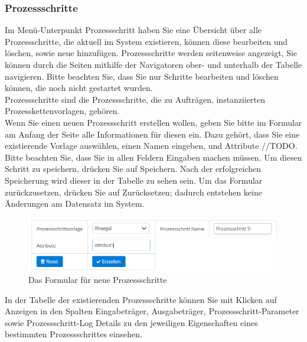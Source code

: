 \documentclass[enabledeprecatedfontcommands,fontsize=12pt,paper=a4,twoside]{scrartcl}
\begin{document}
\subsubsection{Prozessschritte}

Im Menü-Unterpunkt Prozessschritt haben Sie eine Übersicht über alle Prozessschritte, die aktuell im System existieren, können diese bearbeiten und löschen, sowie neue hinzufügen. Prozessschritte werden seitenweise angezeigt, Sie können durch die Seiten mithilfe der Navigatoren ober- und unterhalb der Tabelle navigieren. Bitte beachten Sie, dass Sie nur Schritte bearbeiten und löschen können, die noch nicht gestartet wurden. \\

Prozessschritte sind die Prozessschritte, die zu Aufträgen, instanziierten Prozesskettenvorlagen, gehören. \\

Wenn Sie einen neuen Prozessschritt erstellen wollen, geben Sie bitte im Formular am Anfang der Seite alle Informationen für diesen ein. Dazu gehört, dass Sie eine existierende Vorlage auswählen, einen Namen eingeben, und Attribute //TODO. Bitte beachten Sie, dass Sie in allen Feldern Eingaben machen müssen. Um diesen Schritt zu speichern, drücken Sie auf Speichern. Nach der erfolgreichen Speicherung wird dieser in der Tabelle zu sehen sein. Um das Formular zurückzusetzen, drücken Sie auf Zurücksetzen; dadurch entstehen keine Änderungen am Datensatz im System. \\

\begin{figure}[h!]
\begin{center}
 \includegraphics[width=\textwidth]{screenshots/pk/01prozessschrittformular.png}
  \caption{Das Formular für neue Prozessschritte}
  \label{fig:boat2}
\end{center}
\end{figure}

In der Tabelle der existierenden Prozessschritte können Sie mit Klicken auf Anzeigen in den Spalten Eingabeträger, Ausgabeträger, Prozessschritt-Parameter sowie Prozessschritt-Log Details zu den jeweiligen Eigenschaften eines bestimmten Prozessschrittes einsehen. \\
\end{document}
